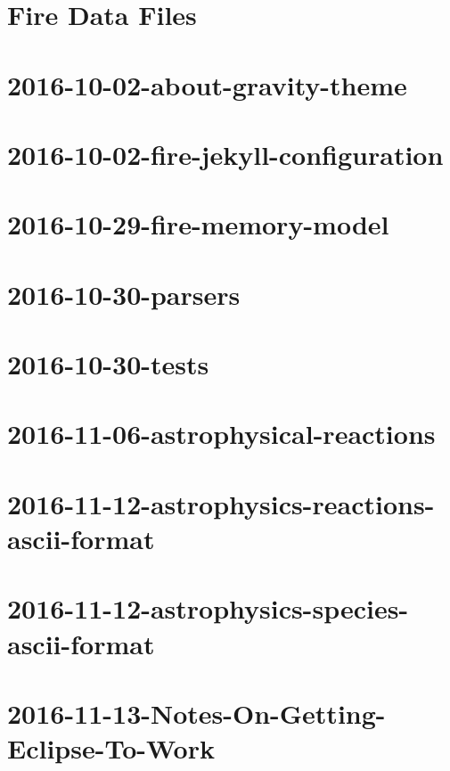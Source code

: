 \documentclass[twoside]{book}
\newcommand{\+}{\discretionary{\mbox{\scriptsize$\hookleftarrow$}}{}{}}
\begin{document}
\chapter{Fire Data Files}
\label{a03048}

\chapter{2016-\/10-\/02-\/about-\/gravity-\/theme}
\label{a03049}

\chapter{2016-\/10-\/02-\/fire-\/jekyll-\/configuration}
\label{a03050}

\chapter{2016-\/10-\/29-\/fire-\/memory-\/model}
\label{a03051}

\chapter{2016-\/10-\/30-\/parsers}
\label{a03052}

\chapter{2016-\/10-\/30-\/tests}
\label{a03053}

\chapter{2016-\/11-\/06-\/astrophysical-\/reactions}
\label{a03054}

\chapter{2016-\/11-\/12-\/astrophysics-\/reactions-\/ascii-\/format}
\label{a03055}

\chapter{2016-\/11-\/12-\/astrophysics-\/species-\/ascii-\/format}
\label{a03056}

\chapter{2016-\/11-\/13-\/\+Notes-\/\+On-\/\+Getting-\/\+Eclipse-\/\+To-\/\+Work}
\label{a03057}

\end{document}
